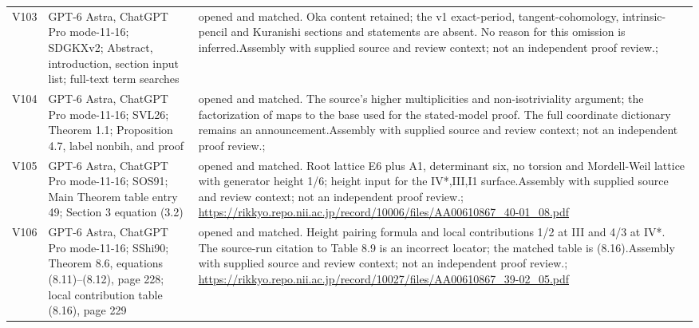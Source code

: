\begin{longtable}{@{}L{.08\linewidth}L{.31\linewidth}L{.56\linewidth}@{}}
V103 & GPT-6 Astra, ChatGPT Pro mode-11-16; S\newline DGKXv2; Abstract, introduction, section input list; full-text term searches & opened and matched. Oka content retained; the v1 exact-period, tangent-cohomology, intrinsic-pencil and Kuranishi sections and statements are absent. No reason for this omission is inferred.\newline Assembly with supplied source and review context; not an independent proof review.\newline {}; \\
V104 & GPT-6 Astra, ChatGPT Pro mode-11-16; S\newline VL26; Theorem 1.1; Proposition 4.7, label nonbih, and proof & opened and matched. The source's higher multiplicities and non-isotriviality argument; the factorization of maps to the base used for the stated-model proof. The full coordinate dictionary remains an announcement.\newline Assembly with supplied source and review context; not an independent proof review.\newline {}; \\
V105 & GPT-6 Astra, ChatGPT Pro mode-11-16; S\newline OS91; Main Theorem table entry 49; Section 3 equation (3.2) & opened and matched. Root lattice E6 plus A1, determinant six, no torsion and Mordell-Weil lattice with generator height 1/\allowbreak{}6; height input for the IV*,III,I1 surface.\newline Assembly with supplied source and review context; not an independent proof review.\newline {}; \url{https://rikkyo.repo.nii.ac.jp/record/10006/files/AA00610867_40-01_08.pdf}\\
V106 & GPT-6 Astra, ChatGPT Pro mode-11-16; S\newline Shi90; Theorem 8.6, equations (8.11)--(8.12), page 228; local contribution table (8.16), page 229 & opened and matched. Height pairing formula and local contributions 1/\allowbreak{}2 at III and 4/\allowbreak{}3 at IV*. The source-run citation to Table 8.9 is an incorrect locator; the matched table is (8.16).\newline Assembly with supplied source and review context; not an independent proof review.\newline {}; \url{https://rikkyo.repo.nii.ac.jp/record/10027/files/AA00610867_39-02_05.pdf}\\

\end{longtable}
